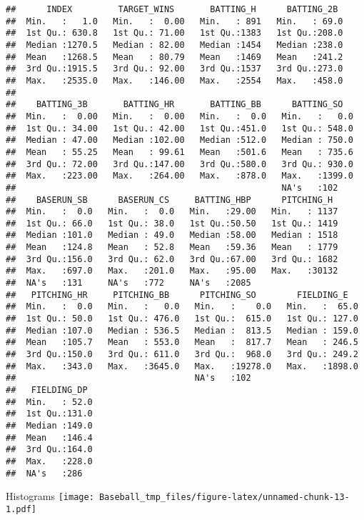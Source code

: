 \documentclass[
]{article}
\begin{document}
\begin{verbatim}
##      INDEX         TARGET_WINS       BATTING_H      BATTING_2B   
##  Min.   :   1.0   Min.   :  0.00   Min.   : 891   Min.   : 69.0  
##  1st Qu.: 630.8   1st Qu.: 71.00   1st Qu.:1383   1st Qu.:208.0  
##  Median :1270.5   Median : 82.00   Median :1454   Median :238.0  
##  Mean   :1268.5   Mean   : 80.79   Mean   :1469   Mean   :241.2  
##  3rd Qu.:1915.5   3rd Qu.: 92.00   3rd Qu.:1537   3rd Qu.:273.0  
##  Max.   :2535.0   Max.   :146.00   Max.   :2554   Max.   :458.0  
##                                                                  
##    BATTING_3B       BATTING_HR       BATTING_BB      BATTING_SO    
##  Min.   :  0.00   Min.   :  0.00   Min.   :  0.0   Min.   :   0.0  
##  1st Qu.: 34.00   1st Qu.: 42.00   1st Qu.:451.0   1st Qu.: 548.0  
##  Median : 47.00   Median :102.00   Median :512.0   Median : 750.0  
##  Mean   : 55.25   Mean   : 99.61   Mean   :501.6   Mean   : 735.6  
##  3rd Qu.: 72.00   3rd Qu.:147.00   3rd Qu.:580.0   3rd Qu.: 930.0  
##  Max.   :223.00   Max.   :264.00   Max.   :878.0   Max.   :1399.0  
##                                                    NA's   :102     
##    BASERUN_SB      BASERUN_CS     BATTING_HBP      PITCHING_H   
##  Min.   :  0.0   Min.   :  0.0   Min.   :29.00   Min.   : 1137  
##  1st Qu.: 66.0   1st Qu.: 38.0   1st Qu.:50.50   1st Qu.: 1419  
##  Median :101.0   Median : 49.0   Median :58.00   Median : 1518  
##  Mean   :124.8   Mean   : 52.8   Mean   :59.36   Mean   : 1779  
##  3rd Qu.:156.0   3rd Qu.: 62.0   3rd Qu.:67.00   3rd Qu.: 1682  
##  Max.   :697.0   Max.   :201.0   Max.   :95.00   Max.   :30132  
##  NA's   :131     NA's   :772     NA's   :2085                   
##   PITCHING_HR     PITCHING_BB      PITCHING_SO        FIELDING_E    
##  Min.   :  0.0   Min.   :   0.0   Min.   :    0.0   Min.   :  65.0  
##  1st Qu.: 50.0   1st Qu.: 476.0   1st Qu.:  615.0   1st Qu.: 127.0  
##  Median :107.0   Median : 536.5   Median :  813.5   Median : 159.0  
##  Mean   :105.7   Mean   : 553.0   Mean   :  817.7   Mean   : 246.5  
##  3rd Qu.:150.0   3rd Qu.: 611.0   3rd Qu.:  968.0   3rd Qu.: 249.2  
##  Max.   :343.0   Max.   :3645.0   Max.   :19278.0   Max.   :1898.0  
##                                   NA's   :102                       
##   FIELDING_DP   
##  Min.   : 52.0  
##  1st Qu.:131.0  
##  Median :149.0  
##  Mean   :146.4  
##  3rd Qu.:164.0  
##  Max.   :228.0  
##  NA's   :286
\end{verbatim}

Histograms
\texttt{[image: Baseball\_tmp\_files/figure-latex/unnamed-chunk-13-1.pdf]}
\end{document}
